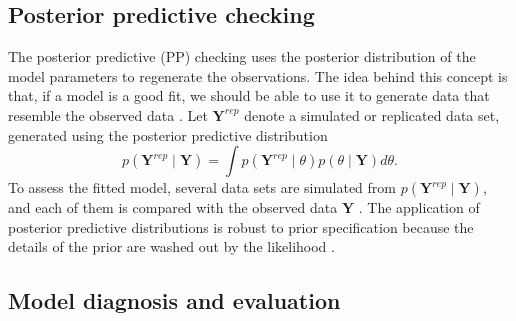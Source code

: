 \documentclass[a4paper]{article}   	%
\begin{document}
	
	\subsection{Posterior predictive checking}
	
	
	The posterior predictive (PP) checking uses the posterior distribution of the model parameters to regenerate the observations. The idea behind this concept is that, if a model is a good fit, we should be able to use it to generate data that resemble the observed data \parencite{gabry2019Visualization}. Let $\bm{Y}^{rep}$ denote a simulated or replicated data set, generated using the posterior predictive distribution 
	\begin{equation}\label{eq:PredPost}
		p(\bm{Y}^{rep} \mid \bm{Y}) = \int p(\bm{Y}^{rep} \mid \theta)p(\theta \mid \bm{Y}) d\theta. 
	\end{equation}
	To assess the fitted model, several data sets are simulated from 	$p(\bm{Y}^{rep} \mid \bm{Y})$, and each of them is compared with the observed data $\bm{Y}$ \parencite{dipakdey2005Bayesian, Congdon2019Bayesian}. The application of posterior predictive distributions is robust to prior specification because the details of the prior are washed out by the likelihood \parencite{gelman2017Prior}.
	
	
	
	\subsection{Model diagnosis and evaluation}
	
\end{document}

